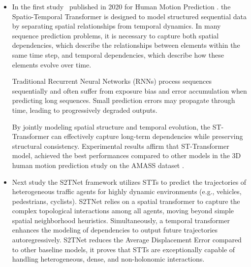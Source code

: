 \documentclass[12pt, a4paper]{report}
\begin{document}
\begin{itemize}
    \item 
In the first study~\cite{aksan2020spatio} published in 2020 for Human Motion Prediction . the Spatio-Temporal Transformer is designed to model structured sequential data by separating spatial relationships from temporal dynamics. In many sequence prediction problems, it is necessary to capture both spatial dependencies, which describe the relationships between elements within the same time step, and temporal dependencies, which describe how these elements evolve over time.

Traditional Recurrent Neural Networks (RNNs) process sequences sequentially and often suffer from exposure bias and error accumulation when predicting long sequences. Small prediction errors may propagate through time, leading to progressively degraded outputs.

By jointly modeling spatial structure and temporal evolution, the ST-Transformer can effectively capture long-term dependencies while preserving structural consistency. Experimental results affirm that  ST-Transformer model, achieved the best performances compared to other models in the 3D human motion prediction study on the AMASS dataset \cite{AMASS:2019}.



\item Next study \cite{s2tnet2021} the S2TNet framework utilizes STTs to predict the trajectories of heterogeneous traffic agents for highly dynamic environments (e.g., vehicles, pedestrians, cyclists). S2TNet relies on a spatial transformer to capture the complex topological interactions among all agents, moving beyond simple spatial neighborhood heuristics. Simultaneously, a temporal transformer enhances the modeling of dependencies to output future trajectories autoregressively. S2TNet reduces the Average Displacement Error compared to other baseline models, it proves that STTs are exceptionally capable of handling heterogeneous, dense, and non-holonomic interactions.



\end{itemize}
\end{document}
